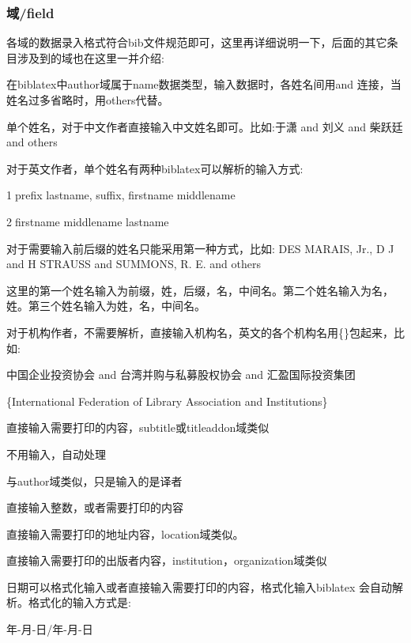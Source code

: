 \subsubsection{域/field}\label{sec:field}
各域的数据录入格式符合bib文件规范即可，这里再详细说明一下，后面的其它条目涉及到的域也在这里一并介绍:
\begin{description}[topsep=5pt,partopsep=0pt,parsep=0pt,%
itemsep=0pt,leftmargin=2.2cm,rightmargin=0.5cm,labelwidth=2cm]
  \item[author] 在biblatex中author域属于name数据类型，输入数据时，各姓名间用and 连接，当姓名过多省略时，用others代替。

      单个姓名，对于中文作者直接输入中文姓名即可。比如:于潇 and 刘义 and 柴跃廷 and others

      对于英文作者，单个姓名有两种biblatex可以解析的输入方式:

      \textcircled{1}prefix lastname, suffix, firstname middlename

      \textcircled{2}firstname middlename lastname

      对于需要输入前后缀的姓名只能采用第一种方式，比如:
      DES MARAIS, Jr., D J and H STRAUSS and SUMMONS, R. E. and others

      这里的第一个姓名输入为前缀，姓，后缀，名，中间名。第二个姓名输入为名，姓。第三个姓名输入为姓，名，中间名。

      对于机构作者，不需要解析，直接输入机构名，英文的各个机构名用\{\}包起来，比如:

      中国企业投资协会 and 台湾并购与私募股权协会 and 汇盈国际投资集团

      \{International Federation of Library Association and Institutions\}

  \item[title] 直接输入需要打印的内容，subtitle或titleaddon域类似
  \item[usera] 不用输入，自动处理
  \item[translator] 与author域类似，只是输入的是译者
  \item[edition] 直接输入整数，或者需要打印的内容
  \item[address] 直接输入需要打印的地址内容，location域类似。
  \item[publisher] 直接输入需要打印的出版者内容，institution，organization域类似
  \item[date] 日期可以格式化输入或者直接输入需要打印的内容，格式化输入biblatex 会自动解析。格式化的输入方式是:

      年-月-日/年-月-日


\end{description}

